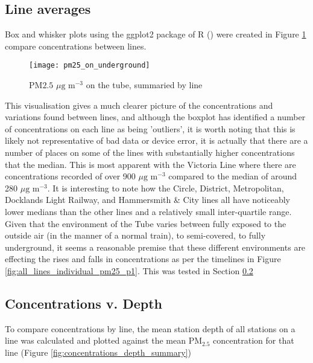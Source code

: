 \subsection{Line averages}
\label{subsec:line_averages}

Box and whisker plots using the ggplot2 package of R (\cite{ggplot2}) were created in Figure \ref{fig:boxplot_pm25_lines} compare concentrations between lines.

\begin{figure}[H]
\centering
\texttt{[image: pm25\_on\_underground]}
\caption{PM${2.5}$ $\mu \text{g m}^{-3}$ on the tube, summaried by line}
\label{fig:boxplot_pm25_lines}
\end{figure}

This visualisation gives a much clearer picture of the concentrations and variations found between lines, and although the boxplot has identified a number of concentrations on each line as being 'outliers', it is worth noting that this is likely not representative of bad data or device error, it is actually that there are a number of places on some of the lines with substantially higher concentrations that the median. This is most apparent with the Victoria Line where there are concentrations recorded of over 900  $\mu \text{g m}^{-3}$ compared to the median of around 280  $\mu \text{g m}^{-3}$. It is interesting to note how the Circle, District, Metropolitan, Docklands Light Railway, and Hammersmith \& City lines all have noticeably lower medians than the other lines and a relatively small inter-quartile range. Given that the environment of the Tube varies between fully exposed to the outside air (in the manner of a normal train), to semi-covered, to fully underground, it seems a reasonable premise that these different environments are effecting the rises and falls in concentrations as per the timelines in Figure \ref{fig:all_lines_individual_pm25_p1}.  This was tested in Section \ref{subsec:concentrations_v_depth}

\subsection{Concentrations v. Depth}
\label{subsec:concentrations_v_depth}

To compare concentrations by line, the mean station depth of all stations on a line was calculated and plotted against the mean PM$_{2.5}$ concentration for that line (Figure \ref{fig:concentrations_depth_summary})

